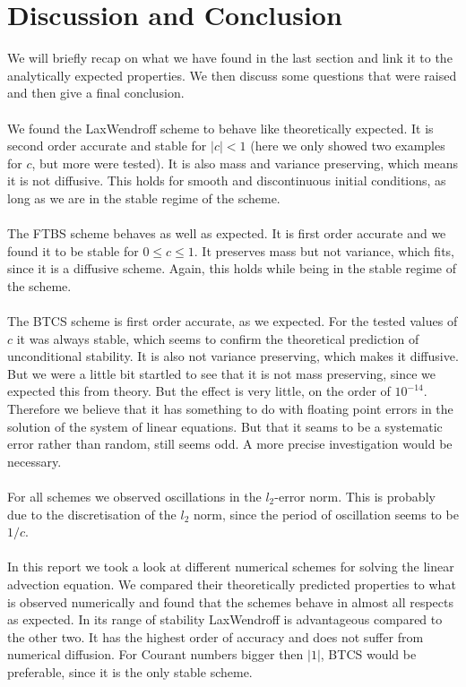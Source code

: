\section{Discussion and Conclusion}\label{ch:discussion}
We will briefly recap on what we have found in the last section and link it to the analytically expected properties. We then discuss some questions that were raised and then give a final conclusion. \\ \\
We found the LaxWendroff scheme to behave like theoretically expected. It is second order accurate and stable for $|c|<1$ (here we only showed two examples for $c$, but more were tested). It is also mass and variance preserving, which means it is not diffusive. This holds for smooth and discontinuous initial conditions, as long as we are in the stable regime of the scheme. \\ \\
The FTBS scheme behaves as well as expected. It is first order accurate and we found it to be stable for $0\leq c \leq 1 $. It preserves mass but not variance, which fits, since it is a diffusive scheme. Again, this holds while being in the stable regime of the scheme.  \\ \\
The BTCS scheme is first order accurate, as we expected. For the tested values of $c$ it was always stable, which seems to confirm the theoretical prediction of unconditional stability. It is also not variance preserving, which makes it diffusive.\\
 But we were a little bit startled to see that it is not mass preserving, since we expected this from theory. But the effect is very little, on the order of $10^{-14}$. Therefore we believe that it has something to do with floating point errors in the solution of the system of linear equations. But that it seams to be a systematic error rather than random, still seems odd. A more precise investigation would be necessary. \\ \\
 For all schemes we observed oscillations in the $l_2$-error norm. This is probably due to the discretisation of the $l_2$ norm, since the period of oscillation seems to be $1/c$. \\ \\
 
 In this report we took a look at different numerical schemes for solving the linear advection equation. We compared their theoretically predicted properties to what is observed numerically and found that the schemes behave in almost all respects as expected. In its range of stability LaxWendroff is advantageous compared to the other two. It has the highest order of accuracy and does not suffer from numerical diffusion. For Courant numbers bigger then $|1|$, BTCS would be preferable, since it is the only stable scheme. 